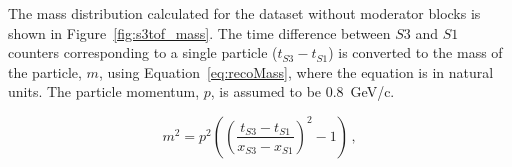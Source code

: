
The mass distribution calculated for the dataset without moderator blocks is shown in Figure~\ref{fig:s3tof_mass}.
The time difference between $\mathit{S3}$ and $\mathit{S1}$ counters corresponding to a single particle ($t_{\mathit{S3}}-t_{\mathit{S1}}$) is converted to the mass of the particle, $m$, using Equation~\ref{eq:recoMass}, where the equation is in natural units.
The particle momentum, $p$, is assumed to be 0.8~GeV/c.


\begin{equation} 
  m^2 = p^2 \left( 
  \left(\frac{t_{\mathit{S3}}-t_{\mathit{S1}}}{x_{\mathit{S3}}-x_{\mathit{S1}}} \right)^2 - 1  \right) \,,
  \label{eq:recoMass}
\end{equation}

